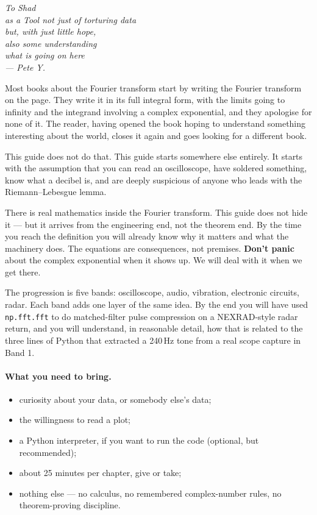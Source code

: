 \documentclass[11pt,a4paper,openany]{book}
\begin{document}
\vspace{0.4cm}

\begin{center}
\itshape
To Shad\\
as a Tool not just of torturing data\\
but, with just little hope,\\
also some understanding\\
what is going on here\\[6pt]
--- Pete Y.
\end{center}

\bigskip

Most books about the Fourier transform start by writing the Fourier
transform on the page. They write it in its full integral form, with
the limits going to infinity and the integrand involving a complex
exponential, and they apologise for none of it. The reader, having
opened the book hoping to understand something interesting about the
world, closes it again and goes looking for a different book.

This guide does not do that. This guide starts somewhere else entirely.
It starts with the assumption that you can read an oscilloscope, have
soldered something, know what a decibel is, and are deeply suspicious
of anyone who leads with the Riemann--Lebesgue lemma.

There is real mathematics inside the Fourier transform. This guide does
not hide it --- but it arrives from the engineering end, not the
theorem end. By the time you reach the definition you will already
know why it matters and what the machinery does. The equations are
consequences, not premises. \textbf{Don't panic} about the complex
exponential when it shows up. We will deal with it when we get there.

The progression is five bands: oscilloscope, audio, vibration,
electronic circuits, radar. Each band adds one layer of the same
idea. By the end you will have used \texttt{np.fft.fft} to do
matched-filter pulse compression on a NEXRAD-style radar return, and
you will understand, in reasonable detail, how that is related to the
three lines of Python that extracted a 240\,Hz tone from a real scope
capture in Band 1.

\paragraph{What you need to bring.}
\begin{itemize}[leftmargin=*,itemsep=0pt]
\item curiosity about your data, or somebody else's data;
\item the willingness to read a plot;
\item a Python interpreter, if you want to run the code (optional, but
  recommended);
\item about 25 minutes per chapter, give or take;
\item nothing else --- no calculus, no remembered complex-number
  rules, no theorem-proving discipline.
\end{itemize}
\end{document}
